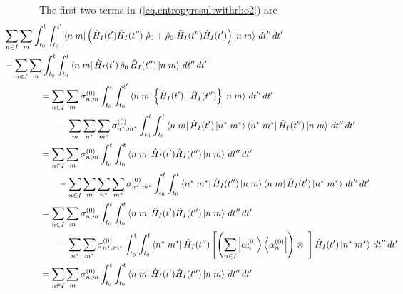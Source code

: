 \documentclass[11pt]{article}
\newcommand{\bra}[1]{\left\langle#1\right|}
\newcommand{\ket}[1]{\left|#1\right\rangle}
\newcommand{\op}[1]{\hat{#1}}
\newcommand{\bket}[2]{\ket{#1\;#2}}
\newcommand{\bbra}[2]{\bra{#1\;#2}}
\theoremstyle{theorem}
\theoremstyle{remark}
\theoremstyle{step}
\theoremstyle{gap}
\begin{document}
The first two terms in (\ref{eq.entropyresultwithrho2}) are
\begin{align*}
&\hspace{-4em} \sum_{n \in I} \sum_m\int_{t_0}^t \int_{t_0}^{t^\prime} \bbra{n}{m} \left( \op{H}_I (t^\prime) \op{H}_I(t^{\prime\prime}) \;\op{\rho}_0 + \op{\rho}_0\; \op{H}_I (t^{\prime\prime}) \op{H}_I(t^{\prime}) \right) \bket{n}{m}\,dt^{\prime\prime}\,dt^\prime \\
&\hspace{-4em}- \sum_{n \in I}\sum_m\int_{t_0}^t \int_{t_0}^{t} \bbra{n}{m}\op{H}_I (t^\prime) \,\op{\rho}_0\, \op{H}_I (t^{\prime\prime})\bket{n}{m}\,dt^{\prime\prime}\,dt^\prime \\
&= \sum_{n \in I}\sum_m\sigma_{n,m}^{(0)} \int_{t_0}^t \int_{t_0}^{t^\prime} \bbra{n}{m} \left\{\op{H}_I (t^\prime),\; \op{H}_I(t^{\prime\prime}) \right\} \bket{n}{m}\,dt^{\prime\prime}\,dt^\prime \\
&\hspace{2em} -\sum_m\sum_{n^\star} \sum_{m^\star} \sigma_{n^\star,m^\star}^{(0)}\int_{t_0}^t \int_{t_0}^{t} \bbra{n}{m}\op{H}_I (t^\prime) \bket{n^\star}{m^\star}\bbra{n^\star}{m^\star} \op{H}_I (t^{\prime\prime})\bket{n}{m}\,dt^{\prime\prime}\,dt^\prime \\
&=\sum_{n \in I}\sum_m \sigma_{n,m}^{(0)} \int_{t_0}^t \int_{t_0}^{t} \bbra{n}{m}\op{H}_I (t^\prime) \op{H}_I(t^{\prime\prime}) \bket{n}{m}\,dt^{\prime\prime}\,dt^\prime \\
&\hspace{2em}-\sum_{n \in I}\sum_m\sum_{n^\star} \sum_{m^\star} \sigma_{n^\star,m^\star}^{(0)}\int_{t_0}^t \int_{t_0}^{t} \bbra{n^\star}{m^\star} \op{H}_I (t^{\prime\prime})\bket{n}{m} \bbra{n}{m}\op{H}_I (t^\prime) \bket{n^\star}{m^\star}\,dt^{\prime\prime}\,dt^\prime \\
&= \sum_{n \in I}\sum_m\sigma_{n,m}^{(0)} \int_{t_0}^t \int_{t_0}^{t} \bbra{n}{m}\op{H}_I (t^\prime) \op{H}_I(t^{\prime\prime}) \bket{n}{m}\,dt^{\prime\prime}\,dt^\prime \\
&\hspace{2em}-\sum_{n^\star} \sum_{m^\star} \sigma_{n^\star,m^\star}^{(0)}\int_{t_0}^t \int_{t_0}^{t} \bbra{n^\star}{m^\star} \op{H}_I (t^{\prime\prime})\left[\left(\sum_{n\in I} \ket{\alpha_n^{(0)}}\bra{\alpha_n^{(0)}}\right)\otimes\cdot\right]\op{H}_I (t^\prime) \bket{n^\star}{m^\star}\,dt^{\prime\prime}\,dt^\prime \\
&=\sum_{n \in I}\sum_m \sigma_{n,m}^{(0)} \int_{t_0}^t \int_{t_0}^{t} \bbra{n}{m}\op{H}_I (t^\prime) \op{H}_I(t^{\prime\prime}) \bket{n}{m}\,dt^{\prime\prime}\,dt^\prime \\

\end{align*}
\end{document}
